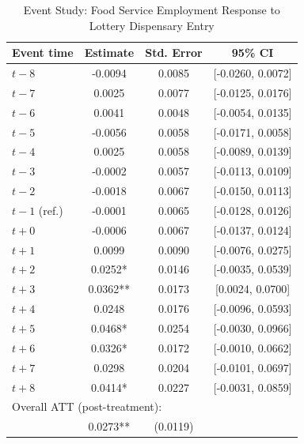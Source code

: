 \begin{table}[t]
\centering
\caption{Event Study: Food Service Employment Response to Lottery Dispensary Entry}
\label{tab:eventstudy}
\begin{tabular}{lccc}
\hline\hline
Event time & Estimate & Std. Error & 95\% CI \\
\hline
$t -8$ & -0.0094 & 0.0085 & [-0.0260, 0.0072] \\
$t -7$ & 0.0025 & 0.0077 & [-0.0125, 0.0176] \\
$t -6$ & 0.0041 & 0.0048 & [-0.0054, 0.0135] \\
$t -5$ & -0.0056 & 0.0058 & [-0.0171, 0.0058] \\
$t -4$ & 0.0025 & 0.0058 & [-0.0089, 0.0139] \\
$t -3$ & -0.0002 & 0.0057 & [-0.0113, 0.0109] \\
$t -2$ & -0.0018 & 0.0067 & [-0.0150, 0.0113] \\
\textit{$t -1$} (ref.) & -0.0001 & 0.0065 & [-0.0128, 0.0126] \\
$t +0$ & -0.0006 & 0.0067 & [-0.0137, 0.0124] \\
$t +1$ & 0.0099 & 0.0090 & [-0.0076, 0.0275] \\
$t +2$ & 0.0252* & 0.0146 & [-0.0035, 0.0539] \\
$t +3$ & 0.0362** & 0.0173 & [0.0024, 0.0700] \\
$t +4$ & 0.0248 & 0.0176 & [-0.0096, 0.0593] \\
$t +5$ & 0.0468* & 0.0254 & [-0.0030, 0.0966] \\
$t +6$ & 0.0326* & 0.0172 & [-0.0010, 0.0662] \\
$t +7$ & 0.0298 & 0.0204 & [-0.0101, 0.0697] \\
$t +8$ & 0.0414* & 0.0227 & [-0.0031, 0.0859] \\
\hline
\multicolumn{4}{l}{Overall ATT (post-treatment):} \\
 & 0.0273** & (0.0119) & \\
\hline\hline
\end{tabular}
\par{}
\end{table}
